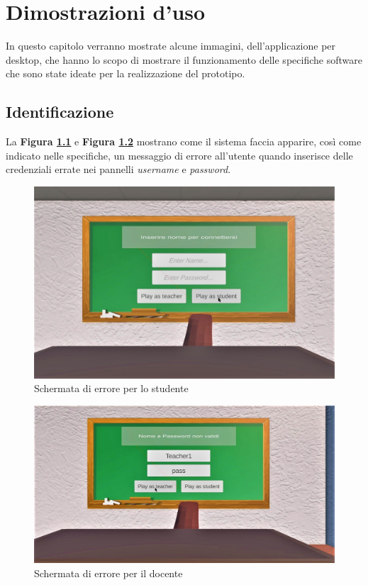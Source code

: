 \chapter{Dimostrazioni d'uso}
In questo capitolo verranno mostrate alcune immagini, dell'applicazione per desktop, che hanno lo scopo di mostrare il funzionamento delle specifiche software che sono state ideate per la realizzazione del prototipo.
\section{Identificazione}
La \textbf{Figura \ref{fig:5.1}} e \textbf{Figura \ref{fig:5.2}} mostrano come il sistema faccia apparire, così come indicato nelle specifiche, un messaggio di errore all'utente quando inserisce delle credenziali errate nei pannelli \textit{username} e \textit{password}.
\begin{figure}[H]
\centering
\includegraphics[scale = 0.3]{Immagini/Dimostrazioni d'uso/loginstuderr.jpg}
\caption{Schermata di errore per lo studente}
\label{fig:5.1}
\end{figure}
\begin{figure}[H]
\centering
\includegraphics[scale = 0.3]{Immagini/Dimostrazioni d'uso/loginteacherr.jpg}
\caption{Schermata di errore per il docente}
\label{fig:5.2}
\end{figure}
